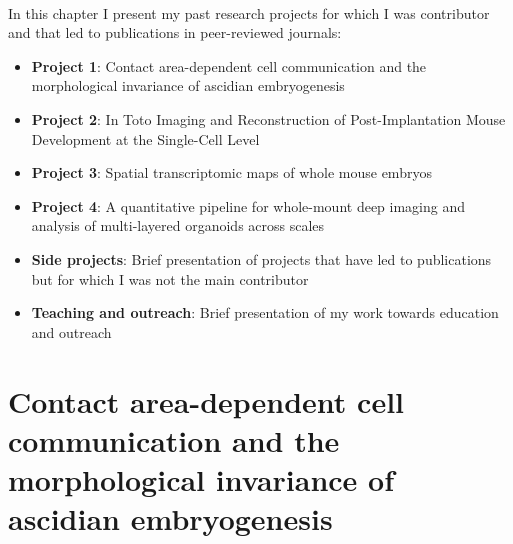 \paragraph{}In this chapter I present my past research projects for which I was contributor and that led to publications in peer-reviewed journals:
\begin{itemize}
\item[] \textbf{Project 1}: Contact area-dependent cell communication and the morphological invariance of ascidian embryogenesis
\item[] \textbf{Project 2}: In Toto Imaging and Reconstruction of Post-Implantation Mouse Development at the Single-Cell Level
\item[] \textbf{Project 3}: Spatial transcriptomic maps of whole mouse embryos
\item[] \textbf{Project 4}: A quantitative pipeline for whole-mount deep imaging and analysis of multi-layered organoids across scales
\item[] \textbf{Side projects}: Brief presentation of projects that have led to publications but for which I was not the main contributor
\item[] \textbf{Teaching and outreach}: Brief presentation of my work towards education and outreach
\end{itemize}
\section{Contact area-dependent cell communication and the morphological invariance of ascidian embryogenesis}
